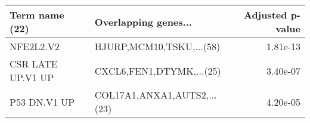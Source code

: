 \begin{tabular}{llr}
\toprule
   Term name (22) &        Overlapping genes... &  Adjusted p-value \\
\midrule
        NFE2L2.V2 &    HJURP,MCM10,TSKU,...(58) &          1.81e-13 \\
CSR LATE UP.V1 UP &    CXCL6,FEN1,DTYMK,...(25) &          3.40e-07 \\
     P53 DN.V1 UP & COL17A1,ANXA1,AUTS2,...(23) &          4.20e-05 \\
\bottomrule
\end{tabular}
